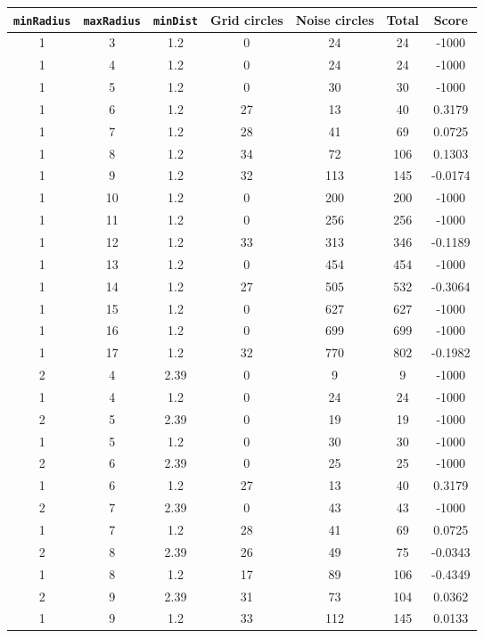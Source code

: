 \documentclass[letterpaper, 12pt]{article}
\begin{document}
\begin{longtable}{|c|c|c|c|c|c|c|}
\hline
\textbf{\texttt{minRadius}} & \textbf{\texttt{maxRadius}} & \textbf{\texttt{minDist}} & \textbf{Grid circles} & \textbf{Noise circles} & \textbf{Total} & \textbf{Score} \\
\hline
1 & 3 & 1.2 & 0 & 24 & 24 & -1000 \\
\hline
1 & 4 & 1.2 & 0 & 24 & 24 & -1000 \\
\hline
1 & 5 & 1.2 & 0 & 30 & 30 & -1000 \\
\hline
1 & 6 & 1.2 & 27 & 13 & 40 & 0.3179 \\
\hline
1 & 7 & 1.2 & 28 & 41 & 69 & 0.0725 \\
\hline
1 & 8 & 1.2 & 34 & 72 & 106 & 0.1303 \\
\hline
1 & 9 & 1.2 & 32 & 113 & 145 & -0.0174 \\
\hline
1 & 10 & 1.2 & 0 & 200 & 200 & -1000 \\
\hline
1 & 11 & 1.2 & 0 & 256 & 256 & -1000 \\
\hline
1 & 12 & 1.2 & 33 & 313 & 346 & -0.1189 \\
\hline
1 & 13 & 1.2 & 0 & 454 & 454 & -1000 \\
\hline
1 & 14 & 1.2 & 27 & 505 & 532 & -0.3064 \\
\hline
1 & 15 & 1.2 & 0 & 627 & 627 & -1000 \\
\hline
1 & 16 & 1.2 & 0 & 699 & 699 & -1000 \\
\hline
1 & 17 & 1.2 & 32 & 770 & 802 & -0.1982 \\
\hline
2 & 4 & 2.39 & 0 & 9 & 9 & -1000 \\
\hline
1 & 4 & 1.2 & 0 & 24 & 24 & -1000 \\
\hline
2 & 5 & 2.39 & 0 & 19 & 19 & -1000 \\
\hline
1 & 5 & 1.2 & 0 & 30 & 30 & -1000 \\
\hline
2 & 6 & 2.39 & 0 & 25 & 25 & -1000 \\
\hline
1 & 6 & 1.2 & 27 & 13 & 40 & 0.3179 \\
\hline
2 & 7 & 2.39 & 0 & 43 & 43 & -1000 \\
\hline
1 & 7 & 1.2 & 28 & 41 & 69 & 0.0725 \\
\hline
2 & 8 & 2.39 & 26 & 49 & 75 & -0.0343 \\
\hline
1 & 8 & 1.2 & 17 & 89 & 106 & -0.4349 \\
\hline
2 & 9 & 2.39 & 31 & 73 & 104 & 0.0362 \\
\hline
1 & 9 & 1.2 & 33 & 112 & 145 & 0.0133 \\

\end{longtable}
\end{document}

